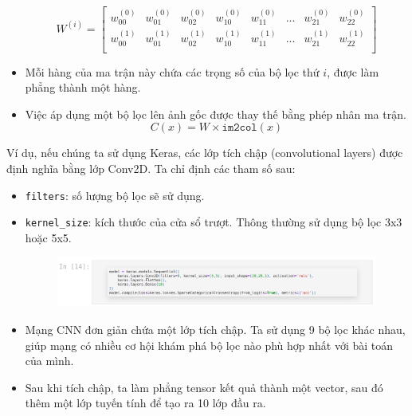 \documentclass{book}
\begin{document}
\begin{itemize}
    \[
    W^{(i)} =
    \begin{bmatrix}
    w^{(0)}_{00} & w^{(0)}_{01} & w^{(0)}_{02} & w^{(0)}_{10} & w^{(0)}_{11} & ... & w^{(0)}_{21} & w^{(0)}_{22}\\
    w^{(1)}_{00} & w^{(1)}_{01} & w^{(1)}_{02} & w^{(1)}_{10} & w^{(1)}_{11} & ... & w^{(1)}_{21} & w^{(1)}_{22}\\
    \end{bmatrix}
    \]
    \item Mỗi hàng của ma trận này chứa các trọng số của bộ lọc thứ $i$, được làm phẳng thành một hàng.
    \item Việc áp dụng một bộ lọc lên ảnh gốc được thay thế bằng phép nhân ma trận.
    \[C(x) = W \times \texttt{im2col}(x)\]
\end{itemize}
Ví dụ, nếu chúng ta sử dụng Keras, các lớp tích chập (convolutional layers) được định nghĩa bằng lớp Conv2D. Ta chỉ định các tham số sau:
\begin{itemize}
    \item \texttt{filters}: số lượng bộ lọc sẽ sử dụng.
    \item \texttt{kernel\_size}: kích thước của cửa sổ trượt. Thông thường sử dụng bộ lọc 3x3 hoặc 5x5.
    \begin{figure}[H]
        \centering
        \includegraphics[width=1.0\linewidth]{images/code2.png}
        \label{fig:code2}
    \end{figure}
    \item Mạng CNN đơn giản chứa một lớp tích chập. Ta sử dụng 9 bộ lọc khác nhau, giúp mạng có nhiều cơ hội khám phá bộ lọc nào phù hợp nhất với bài toán của mình.
    \item Sau khi tích chập, ta làm phẳng tensor kết quả thành một vector, sau đó thêm một lớp tuyến tính để tạo ra 10 lớp đầu ra.
\end{itemize}
\end{document}
